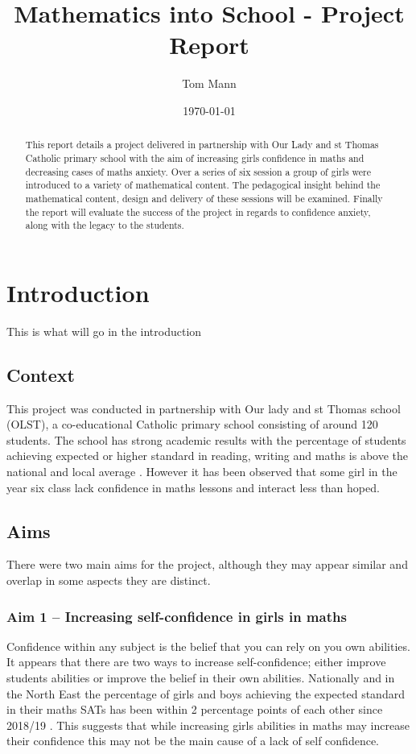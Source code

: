 \documentclass[11pt, a4paper, notitlepage]{article}
\title{Mathematics into School - Project Report}
\author{Tom Mann}
\date{\today}
\begin{document}
\maketitle

\begin{abstract}
    This report details a project delivered in partnership with Our Lady and st Thomas Catholic primary school with the aim of increasing girls confidence in maths and decreasing cases of maths anxiety. Over a series of six session a group of girls were introduced to a variety of mathematical content. The pedagogical insight behind the mathematical content, design and delivery of these sessions will be examined. Finally the report will evaluate the success of the project in regards to confidence anxiety, along with the legacy to the students.
\end{abstract}

\clearpage

\tableofcontents

\clearpage

\section{Introduction}
This is what will go in the introduction

\subsection{Context}
This project was conducted in partnership with Our lady and st Thomas school (OLST), a  co-educational Catholic primary school consisting of around 120 students. The school has strong academic results with the percentage of students achieving expected or higher standard in reading, writing and maths is above the national and local average \cite{OLST_stats}. However it has been observed that some girl in the year six class lack confidence in maths lessons and interact less than hoped.


\subsection{Aims}
There were two main aims for the project, although they may appear similar and overlap in some aspects they are distinct.

\subsubsection{Aim 1 -- Increasing self-confidence in girls in maths} 
Confidence within any subject is the belief that you can rely on you own abilities. It appears that there are two ways to increase self-confidence; either improve students abilities or improve the belief in their own abilities. Nationally and in the North East the percentage of girls and boys achieving the expected standard in their maths SATs has been within 2 percentage points of each other since 2018/19 \cite{maths_SATs_stats}. This suggests that while increasing girls abilities in maths may increase their confidence this may not be the main cause of a lack of self confidence.
\end{document}
